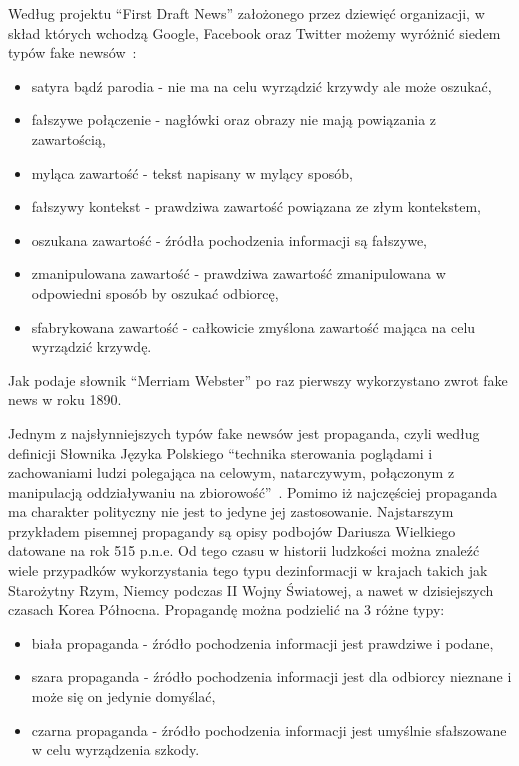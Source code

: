 Według projektu ``First Draft News'' założonego przez dziewięć organizacji, 
w skład których wchodzą Google, Facebook oraz Twitter 
możemy wyróżnić siedem typów fake newsów~\cite{TypesOfFakeNews}:
\begin{itemize}
    \item satyra bądź parodia - nie ma na celu wyrządzić krzywdy ale może oszukać,
    \item fałszywe połączenie - nagłówki oraz obrazy nie mają powiązania z zawartością,
    \item myląca zawartość - tekst napisany w mylący sposób,
    \item fałszywy kontekst - prawdziwa zawartość powiązana ze złym kontekstem,
    \item oszukana zawartość - źródła pochodzenia informacji są fałszywe,
    \item zmanipulowana zawartość - prawdziwa zawartość zmanipulowana w odpowiedni sposób by oszukać odbiorcę,
    \item sfabrykowana zawartość - całkowicie zmyślona zawartość mająca na celu wyrządzić krzywdę.
\end{itemize}
Jak podaje słownik ``Merriam Webster'' po raz pierwszy wykorzystano zwrot
fake news w roku 1890.


Jednym z najsłynniejszych typów fake newsów jest propaganda, czyli według 
definicji Słownika Języka Polskiego ``technika sterowania poglądami i zachowaniami ludzi polegająca na 
celowym, natarczywym, połączonym z manipulacją oddziaływaniu na zbiorowość''~\cite{SJP}.
Pomimo iż najczęściej propaganda ma charakter polityczny nie jest to jedyne 
jej zastosowanie. Najstarszym przykładem pisemnej propagandy są opisy podbojów
Dariusza Wielkiego datowane na rok 515 p.n.e. Od tego czasu w historii ludzkości
można znaleźć wiele przypadków wykorzystania tego typu dezinformacji w krajach takich
jak Starożytny Rzym, Niemcy podczas II Wojny Światowej, a nawet w dzisiejszych 
czasach Korea Północna.
Propagandę można podzielić na 3 różne typy:
\begin{itemize}
    \item biała propaganda - źródło pochodzenia informacji jest prawdziwe i podane,
    \item szara propaganda - źródło pochodzenia informacji jest dla odbiorcy nieznane i może się on jedynie domyślać,
    \item czarna propaganda - źródło pochodzenia informacji jest umyślnie sfałszowane w celu wyrządzenia szkody.
\end{itemize}


